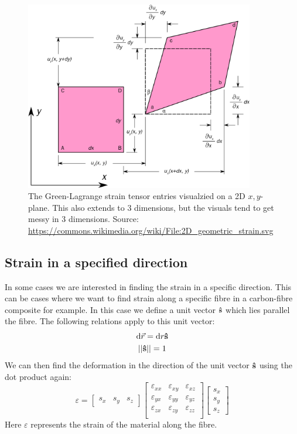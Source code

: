 \documentclass[11pt, a4paper]{article}
\renewcommand*{\epsilon}{\varepsilon}
\renewcommand*{\d}{\text{d}}
\DeclareRobustCommand{\uvec}[1]{{%
  \ifcat\relax\noexpand#1%
    \bm{\hat{#1}}%
  \else
    \ifcsname uvec#1\endcsname
      \csname uvec#1\endcsname
    \else
      \bm{\hat{\mathbf{#1}}}%
     \fi
   \fi
}}
\numberwithin{equation}{section}
\numberwithin{figure}{section}
\begin{document}
\begin{figure}[h]
  \centerline{\includegraphics[width=100mm]{images/Strain_2D.png}}
  \caption{The Green-Lagrange strain tensor entries visualzied on a 2D $x,y$-plane. This also extends to 3 dimensions, but the visuals tend to get messy in 3 dimensions. Source: \url{https://commons.wikimedia.org/wiki/File:2D_geometric_strain.svg}}
\end{figure}


\subsection{Strain in a specified direction}
In some cases we are interested in finding the strain in a specific direction. This can be cases where we want to find strain along a specific fibre in a carbon-fibre composite for example. In this case we define a unit vector $\uvec{s}$ which lies parallel the fibre. The following relations apply to this unit vector:
\begin{gather}
  \d \vec{r} = \d r \uvec{s}\\
  ||\uvec{s}|| = 1
\end{gather}
We can then find the deformation in the direction of the unit vector $\uvec{s}$ using the dot product again:
\begin{equation}
  \epsilon =
  \begin{bmatrix}
    s_x &
    s_y &
    s_z
  \end{bmatrix}
  \begin{bmatrix}
    \epsilon_{xx} & \epsilon_{xy} & \epsilon_{xz} \\
    \epsilon_{yx} & \epsilon_{yy} & \epsilon_{yz} \\
    \epsilon_{zx} & \epsilon_{zy} & \epsilon_{zz} \\
  \end{bmatrix}
  \begin{bmatrix}
    s_x \\
    s_y \\
    s_z
  \end{bmatrix}
\end{equation}
Here $\epsilon$ represents the strain of the material along the fibre.
\end{document}

